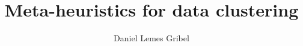\documentclass[
  msc
]{ThesisPUC}
\author{Daniel Lemes Gribel}
\title{Meta-heuristics for data clustering}
\begin{document}
  
  
  
  
  
  \arial
  
  \normalfont
\end{document}
